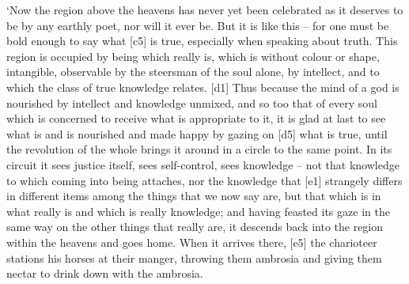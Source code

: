 ‘Now the region above the heavens has never yet been celebrated as it
deserves to be by any earthly poet, nor will it ever be. But it is like
this -- for one must be bold enough to say what {[}c5{]} is true,
especially when speaking about truth. This region is occupied by being
which really is, which is without colour or shape, intangible,
observable by the steersman of the soul alone, by intellect, and to
which the class of true knowledge
relates. {[}d1{]} Thus
because the mind of a god is nourished by intellect and knowledge
unmixed, and so too that of every soul which is concerned to receive
what is appropriate to it, it is glad at last to see what is and is
nourished and made happy by gazing on {[}d5{]} what is true, until the
revolution of the whole brings it around in a circle to the same point.
In its circuit it sees justice itself, sees
self-control, sees
knowledge -- not that knowledge to which coming into being attaches, nor
the knowledge that {[}e1{]} strangely differs in different items among
the things that we now say
are, but that which is
in what really is and which is really knowledge; and having feasted its
gaze in the same way on the other things that really are, it descends
back into the region within the heavens and goes home. When it arrives
there, {[}e5{]} the charioteer stations his horses at their manger,
throwing them ambrosia and giving them nectar to drink down with the
ambrosia.


